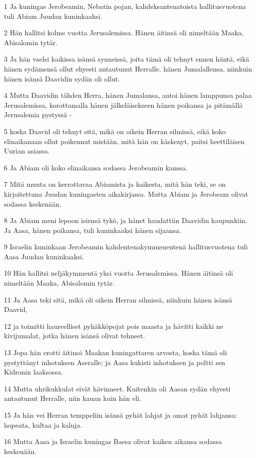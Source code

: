 \par 1 Ja kuningas Jerobeamin, Nebatin pojan, kahdeksantenatoista hallitusvuotena tuli Abiam Juudan kuninkaaksi.
\par 2 Hän hallitsi kolme vuotta Jerusalemissa. Hänen äitinsä oli nimeltään Maaka, Abisalomin tytär.
\par 3 Ja hän vaelsi kaikissa isänsä synneissä, joita tämä oli tehnyt ennen häntä, eikä hänen sydämensä ollut ehyesti antautunut Herralle, hänen Jumalallensa, niinkuin hänen isänsä Daavidin sydän oli ollut.
\par 4 Mutta Daavidin tähden Herra, hänen Jumalansa, antoi hänen lamppunsa palaa Jerusalemissa, korottamalla hänen jälkeläisekseen hänen poikansa ja pitämällä Jerusalemia pystyssä -
\par 5 koska Daavid oli tehnyt sitä, mikä on oikein Herran silmissä, eikä koko elinaikanaan ollut poikennut mistään, mitä hän on käskenyt, paitsi heettiläisen Uurian asiassa.
\par 6 Ja Abiam oli koko elinaikansa sodassa Jerobeamin kanssa.
\par 7 Mitä muuta on kerrottavaa Abiamista ja kaikesta, mitä hän teki, se on kirjoitettuna Juudan kuningasten aikakirjassa. Mutta Abiam ja Jerobeam olivat sodassa keskenään.
\par 8 Ja Abiam meni lepoon isiensä tykö, ja hänet haudattiin Daavidin kaupunkiin. Ja Aasa, hänen poikansa, tuli kuninkaaksi hänen sijaansa.
\par 9 Israelin kuninkaan Jerobeamin kahdentenakymmenentenä hallitusvuotena tuli Aasa Juudan kuninkaaksi.
\par 10 Hän hallitsi neljäkymmentä yksi vuotta Jerusalemissa. Hänen äitinsä oli nimeltään Maaka, Abisalomin tytär.
\par 11 Ja Aasa teki sitä, mikä oli oikein Herran silmissä, niinkuin hänen isänsä Daavid,
\par 12 ja toimitti haureelliset pyhäkköpojat pois maasta ja hävitti kaikki ne kivijumalat, jotka hänen isänsä olivat tehneet.
\par 13 Jopa hän erotti äitinsä Maakan kuningattaren arvosta, koska tämä oli pystyttänyt inhotuksen Aseralle; ja Aasa kukisti inhotuksen ja poltti sen Kidronin laaksossa.
\par 14 Mutta uhrikukkulat eivät hävinneet. Kuitenkin oli Aasan sydän ehyesti antautunut Herralle, niin kauan kuin hän eli.
\par 15 Ja hän vei Herran temppeliin isänsä pyhät lahjat ja omat pyhät lahjansa: hopeata, kultaa ja kaluja.
\par 16 Mutta Aasa ja Israelin kuningas Baesa olivat kaiken aikansa sodassa keskenään.
